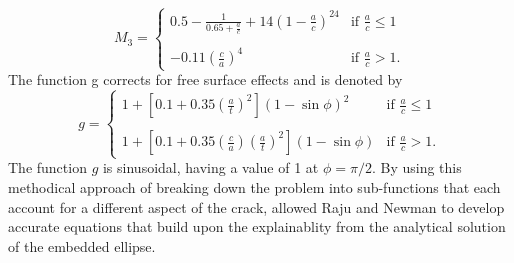 \begin{equation} \label{eqn:RN_M3}
    M_3 = \begin{cases}
    0.5 - \frac{1}{0.65+\frac{a}{c}} + 14\left(1-\frac{a}{c}\right)^{24} & \text{if } \frac{a}{c} \le 1 \\
    \\
    -0.11\left(\frac{c}{a}\right)^4 & \text{if } \frac{a}{c} > 1.
    \end{cases}
\end{equation}
The function g corrects for free surface effects and is denoted by
\begin{equation} \label{eqn:RN_g}
    g = \begin{cases}
    1 + \left[0.1 + 0.35\left(\frac{a}{t}\right)^2\right]\left(1 - \sin\phi\right)^2 & \text{if } \frac{a}{c} \le 1 \\
    \\
    1 + \left[0.1 + 0.35\left(\frac{c}{a}\right)\left(\frac{a}{t}\right)^2\right]\left(1 - \sin\phi\right) & \text{if } \frac{a}{c} > 1.
    \end{cases}
\end{equation}
The function $g$ is sinusoidal, having a value of 1 at $\phi = \pi/2$.  By using this methodical approach of breaking down the problem into sub-functions that each account for a different aspect of the crack, allowed Raju and Newman to develop accurate equations that build upon the explainablity from the analytical solution of the embedded ellipse. 

